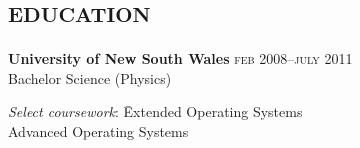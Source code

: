 

\vspace{-0.6cm}
\section*{\textsc{education}}
\vspace{-0.2cm}

\textbf{University of New South Wales}\tabto{9.5cm} \textsc{feb} 2008--\textsc{july} 2011\\
Bachelor Science (Physics)
\vspace{-0.3cm}
\begin{tabbing}
\textit{Select coursework}: \=Extended Operating Systems \\
                            \>Advanced Operating Systems
\end{tabbing}


